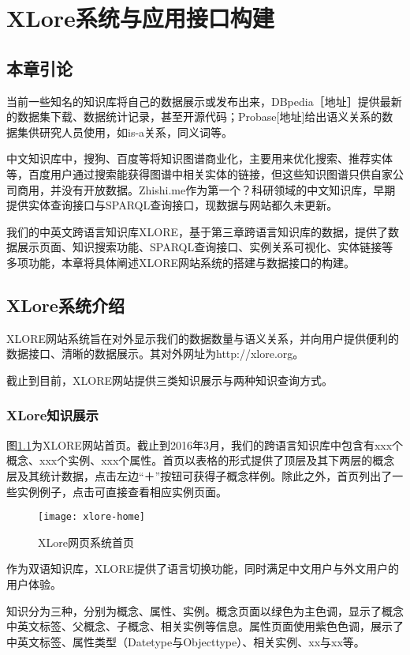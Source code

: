 \chapter{XLore系统与应用接口构建}
\label{cha:xlore-system-api}

\section{本章引论}
当前一些知名的知识库将自己的数据展示或发布出来，DBpedia［地址］提供最新的数据集下载、数据统计记录，甚至开源代码；Probase[地址]给出语义关系的数据集供研究人员使用，如is-a关系，同义词等。

中文知识库中，搜狗、百度等将知识图谱商业化，主要用来优化搜索、推荐实体等，百度用户通过搜索能获得图谱中相关实体的链接，但这些知识图谱只供自家公司商用，并没有开放数据。Zhishi.me作为第一个？科研领域的中文知识库，早期提供实体查询接口与SPARQL查询接口，现数据与网站都久未更新。

我们的中英文跨语言知识库XLORE，基于第三章跨语言知识库的数据，提供了数据展示页面、知识搜索功能、SPARQL查询接口、实例关系可视化、实体链接等多项功能，本章将具体阐述XLORE网站系统的搭建与数据接口的构建。

\section{XLore系统介绍}
XLORE网站系统旨在对外显示我们的数据数量与语义关系，并向用户提供便利的数据接口、清晰的数据展示。其对外网址为http://xlore.org。

截止到目前，XLORE网站提供三类知识展示与两种知识查询方式。

\subsection{XLore知识展示}
图\ref{fig:xlore-home}为XLORE网站首页。截止到2016年3月，我们的跨语言知识库中包含有xxx个概念、xxx个实例、xxx个属性。首页以表格的形式提供了顶层及其下两层的概念层及其统计数据，点击左边“＋”按钮可获得子概念样例。除此之外，首页列出了一些实例例子，点击可直接查看相应实例页面。

\begin{figure}[H] 
  \centering
  \texttt{[image: xlore-home]}
  \caption{XLore网页系统首页}
  \label{fig:xlore-home}
\end{figure}

作为双语知识库，XLORE提供了语言切换功能，同时满足中文用户与外文用户的用户体验。

知识分为三种，分别为概念、属性、实例。概念页面以绿色为主色调，显示了概念中英文标签、父概念、子概念、相关实例等信息。属性页面使用紫色色调，展示了中英文标签、属性类型（Datetype与Objecttype）、相关实例、xx与xx等。

